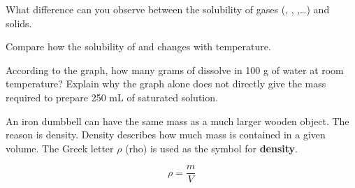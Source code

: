 \newpage


\ResponseGap[100pt]


\begin{minipage}[t]{0.55\linewidth}
  \vspace{0pt}

  \begin{ExerciseParts}

    \item What difference can you observe
    between the solubility of gases (, , ,…) and solids.

    \ResponseGap

    \item Compare how the solubility of  and 
    changes with temperature.

    \ResponseGap

	\item According to the graph, how many grams of 
    dissolve in 100 g of water at room temperature?
    Explain why the graph alone does not directly give
    the mass required to prepare 250 mL of saturated solution.

    \ResponseGap[60pt]

  \end{ExerciseParts}

\end{minipage}\hfill
\begin{minipage}[t]{0.42\linewidth}
  \vspace{0pt}
  \SolubilityCurvesFigure
\end{minipage}


\ResponseGap[60pt]

\newpage
{}

An iron dumbbell can have the same mass as a much larger wooden object. The reason is density. Density describes how much mass is contained in a given volume. The Greek letter \textbf{$\rho$} (rho) is used as the symbol for \textbf{density}.

\[\rho=\frac{m}{V}\]


